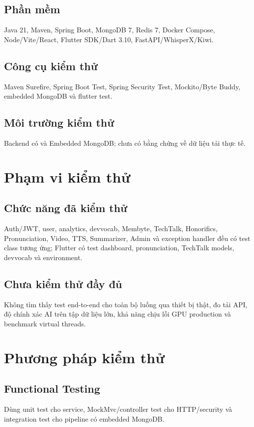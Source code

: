 \documentclass[12pt,a4paper]{report}
\newcommand{\code}[1]{\texttt{\detokenize{#1}}}
\begin{document}
\subsection{Phần mềm} Java 21, Maven, Spring Boot, MongoDB 7, Redis 7, Docker Compose, Node/Vite/React, Flutter SDK/Dart 3.10, FastAPI/WhisperX/Kiwi.\newline
\subsection{Công cụ kiểm thử} Maven Surefire, Spring Boot Test, Spring Security Test, Mockito/Byte Buddy, embedded MongoDB và flutter test.\newline
\subsection{Môi trường kiểm thử} Backend có \code{application-test.yml} và Embedded MongoDB; chưa có bằng chứng về dữ liệu tải thực tế.
\section{Phạm vi kiểm thử}
\subsection{Chức năng đã kiểm thử} Auth/JWT, user, analytics, devvocab, Membyte, TechTalk, Honorifics, Pronunciation, Video, TTS, Summarizer, Admin và exception handler đều có test class tương ứng; Flutter có test dashboard, pronunciation, TechTalk models, devvocab và environment.\newline
\subsection{Chưa kiểm thử đầy đủ} Không tìm thấy test end-to-end cho toàn bộ luồng qua thiết bị thật, đo tải API, độ chính xác AI trên tập dữ liệu lớn, khả năng chịu lỗi GPU production và benchmark virtual threads.
\section{Phương pháp kiểm thử}
\subsection{Functional Testing} Dùng unit test cho service, MockMvc/controller test cho HTTP/security và integration test cho pipeline có embedded MongoDB.\newline
\end{document}
